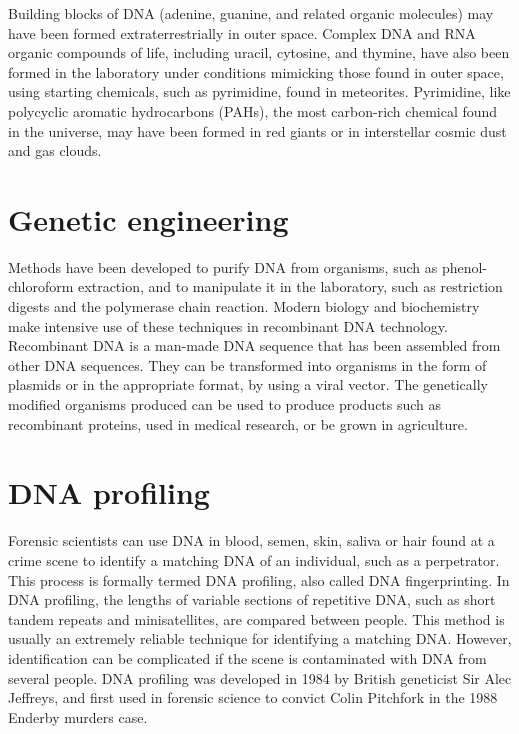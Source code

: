 Building blocks of DNA (adenine, guanine, and related organic molecules) may have been formed extraterrestrially in outer space. Complex DNA and RNA organic compounds of life, including uracil, cytosine, and thymine, have also been formed in the laboratory under conditions mimicking those found in outer space, using starting chemicals, such as pyrimidine, found in meteorites. Pyrimidine, like polycyclic aromatic hydrocarbons (PAHs), the most carbon-rich chemical found in the universe, may have been formed in red giants or in interstellar cosmic dust and gas clouds.

\hypertarget{genetic-engineering}{%
\section{Genetic engineering}\label{genetic-engineering}}

Methods have been developed to purify DNA from organisms, such as phenol-chloroform extraction, and to manipulate it in the laboratory, such as restriction digests and the polymerase chain reaction. Modern biology and biochemistry make intensive use of these techniques in recombinant DNA technology. Recombinant DNA is a man-made DNA sequence that has been assembled from other DNA sequences. They can be transformed into organisms in the form of plasmids or in the appropriate format, by using a viral vector. The genetically modified organisms produced can be used to produce products such as recombinant proteins, used in medical research, or be grown in agriculture.

\hypertarget{dna-profiling}{%
\section{DNA profiling}\label{dna-profiling}}

Forensic scientists can use DNA in blood, semen, skin, saliva or hair found at a crime scene to identify a matching DNA of an individual, such as a perpetrator. This process is formally termed DNA profiling, also called DNA fingerprinting. In DNA profiling, the lengths of variable sections of repetitive DNA, such as short tandem repeats and minisatellites, are compared between people. This method is usually an extremely reliable technique for identifying a matching DNA. However, identification can be complicated if the scene is contaminated with DNA from several people. DNA profiling was developed in 1984 by British geneticist Sir Alec Jeffreys, and first used in forensic science to convict Colin Pitchfork in the 1988 Enderby murders case.

